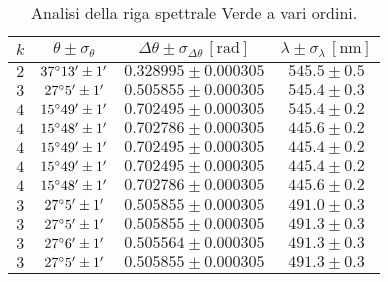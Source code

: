 \documentclass[]{article}
\begin{document}
    \begin{table}[H]
        \centering
        \begin{tabular}{||c|c|c|c||}
            \hline
            $k$ & $\theta \pm \sigma_{\theta}$ & $\Delta\theta \pm \sigma_{\Delta\theta} \, \left[\text{rad}\right]$ & $\lambda \pm \sigma_{\lambda} \, \left[\text{nm}\right]$ \\\hline
            \hline
            $2$ & $37\degree 13' \pm 1'$ & $0.328995 \pm 0.000305$ & $545.5 \pm 0.5$ \\\hline
            $3$ & $27\degree  5' \pm 1'$ & $0.505855 \pm 0.000305$ & $545.4 \pm 0.3$ \\\hline
            $4$ & $15\degree 49' \pm 1'$ & $0.702495 \pm 0.000305$ & $545.4 \pm 0.2$ \\\hline
            $4$ & $15\degree 48' \pm 1'$ & $0.702786 \pm 0.000305$ & $445.6 \pm 0.2$ \\\hline
            $4$ & $15\degree 49' \pm 1'$ & $0.702495 \pm 0.000305$ & $445.4 \pm 0.2$ \\\hline
            $4$ & $15\degree 49' \pm 1'$ & $0.702495 \pm 0.000305$ & $445.4 \pm 0.2$ \\\hline
            $4$ & $15\degree 48' \pm 1'$ & $0.702786 \pm 0.000305$ & $445.6 \pm 0.2$ \\\hline
            $3$ & $27\degree  5' \pm 1'$ & $0.505855 \pm 0.000305$ & $491.0 \pm 0.3$ \\\hline
            $3$ & $27\degree  5' \pm 1'$ & $0.505855 \pm 0.000305$ & $491.3 \pm 0.3$ \\\hline
            $3$ & $27\degree  6' \pm 1'$ & $0.505564 \pm 0.000305$ & $491.3 \pm 0.3$ \\\hline
            $3$ & $27\degree  5' \pm 1'$ & $0.505855 \pm 0.000305$ & $491.3 \pm 0.3$ \\\hline
        \end{tabular}
        \caption{Analisi della riga spettrale Verde a vari ordini.}
        \label{verde}
    \end{table}
\end{document}
